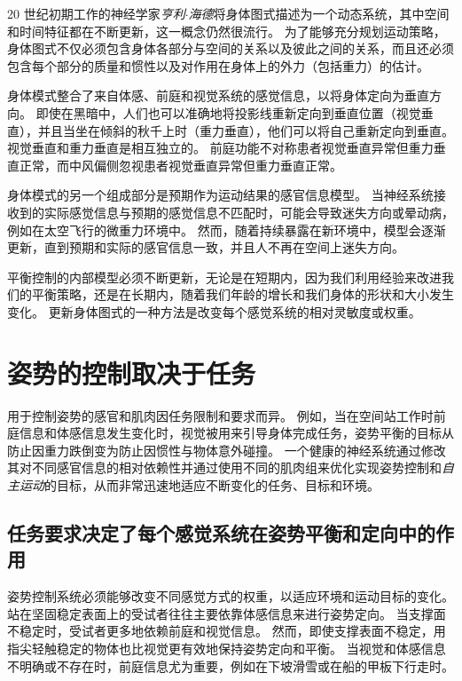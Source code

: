20 世纪初期工作的神经学家\textit{亨利$\cdot$海德}将身体图式描述为一个动态系统，其中空间和时间特征都在不断更新，这一概念仍然很流行。
为了能够充分规划运动策略，身体图式不仅必须包含身体各部分与空间的关系以及彼此之间的关系，而且还必须包含每个部分的质量和惯性以及对作用在身体上的外力（包括重力）的估计。


身体模式整合了来自体感、前庭和视觉系统的感觉信息，以将身体定向为垂直方向。
即使在黑暗中，人们也可以准确地将投影线重新定向到垂直位置（视觉垂直），并且当坐在倾斜的秋千上时（重力垂直），他们可以将自己重新定向到垂直。
视觉垂直和重力垂直是相互独立的。
前庭功能不对称患者视觉垂直异常但重力垂直正常，而中风偏侧忽视患者视觉垂直异常但重力垂直正常。


身体模式的另一个组成部分是预期作为运动结果的感官信息模型。
当神经系统接收到的实际感觉信息与预期的感觉信息不匹配时，可能会导致迷失方向或晕动病，例如在太空飞行的微重力环境中。
然而，随着持续暴露在新环境中，模型会逐渐更新，直到预期和实际的感官信息一致，并且人不再在空间上迷失方向。


平衡控制的内部模型必须不断更新，无论是在短期内，因为我们利用经验来改进我们的平衡策略，还是在长期内，随着我们年龄的增长和我们身体的形状和大小发生变化。
更新身体图式的一种方法是改变每个感觉系统的相对灵敏度或权重。



\section{姿势的控制取决于任务}

用于控制姿势的感官和肌肉因任务限制和要求而异。
例如，当在空间站工作时前庭信息和体感信息发生变化时，视觉被用来引导身体完成任务，姿势平衡的目标从防止因重力跌倒变为防止因惯性与物体意外碰撞。
一个健康的神经系统通过修改其对不同感官信息的相对依赖性并通过使用不同的肌肉组来优化实现姿势控制和\textit{自主运动}的目标，从而非常迅速地适应不断变化的任务、目标和环境。



\subsection{任务要求决定了每个感觉系统在姿势平衡和定向中的作用}

姿势控制系统必须能够改变不同感觉方式的权重，以适应环境和运动目标的变化。
站在坚固稳定表面上的受试者往往主要依靠体感信息来进行姿势定向。
当支撑面不稳定时，受试者更多地依赖前庭和视觉信息。
然而，即使支撑表面不稳定，用指尖轻触稳定的物体也比视觉更有效地保持姿势定向和平衡。
当视觉和体感信息不明确或不存在时，前庭信息尤为重要，例如在下坡滑雪或在船的甲板下行走时。


